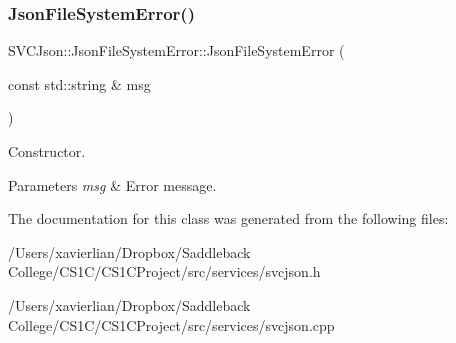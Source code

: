 \subsubsection{\texorpdfstring{JsonFileSystemError()}{JsonFileSystemError()}}
{\footnotesize\ttfamily S\+V\+C\+Json\+::\+Json\+File\+System\+Error\+::\+Json\+File\+System\+Error (\begin{DoxyParamCaption}\item[{const std\+::string \&}]{msg }\end{DoxyParamCaption})}



Constructor. 


\begin{DoxyParams}{Parameters}
{\em msg} & Error message. \\
\hline
\end{DoxyParams}


The documentation for this class was generated from the following files\+:\begin{DoxyCompactItemize}
\item 
/\+Users/xavierlian/\+Dropbox/\+Saddleback College/\+C\+S1\+C/\+C\+S1\+C\+Project/src/services/svcjson.\+h\item 
/\+Users/xavierlian/\+Dropbox/\+Saddleback College/\+C\+S1\+C/\+C\+S1\+C\+Project/src/services/svcjson.\+cpp\end{DoxyCompactItemize}

